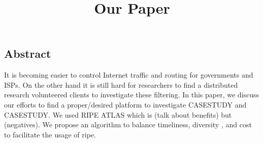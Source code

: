 \documentclass[letterpaper,twocolumn,10pt]{article}
\begin{document}
\date{}

\title{\Large \bf Our Paper}

\author{
}

\maketitle

\thispagestyle{empty}

\subsection*{Abstract}
It is becoming easier to control Internet traffic and routing for governments and ISPs. On the other
hand it is still hard for researchers to find a distributed research volunteered clients to
investigate these filtering. In this paper, we discuss our efforts to find a proper/desired platform
to investigate CASESTUDY and CASESTUDY. We used RIPE ATLAS which is  (talk about benefits) but
(negatives). We propose an algorithm to balance timeliness, diversity , and cost to facilitate the
usage of ripe.














\raggedright
\printbibliography

\theendnotes
\end{document}
